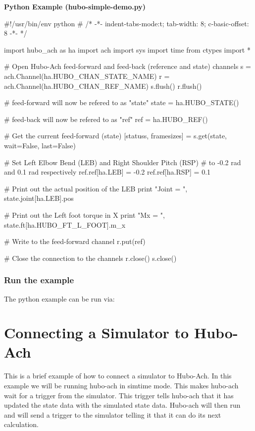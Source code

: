 \footnotesize
\noindent \textbf{Python Example (hubo-simple-demo.py)}
\vspace{-6mm}
\begin{code}
#!/usr/bin/env python
# /* -*-  indent-tabs-mode:t; tab-width: 8; c-basic-offset: 8  -*- */

import hubo_ach as ha
import ach
import sys
import time
from ctypes import *

# Open Hubo-Ach feed-forward and feed-back (reference and state) channels
s = ach.Channel(ha.HUBO_CHAN_STATE_NAME)
r = ach.Channel(ha.HUBO_CHAN_REF_NAME)
s.flush()
r.flush()

# feed-forward will now be refered to as "state"
state = ha.HUBO_STATE()

# feed-back will now be refered to as "ref"
ref = ha.HUBO_REF()

# Get the current feed-forward (state) 
[statuss, framesizes] = s.get(state, wait=False, last=False)

# Set Left Elbow Bend (LEB) and Right Shoulder Pitch (RSP) 
# to  -0.2 rad and 0.1 rad respectively
ref.ref[ha.LEB] = -0.2
ref.ref[ha.RSP] = 0.1

# Print out the actual position of the LEB
print "Joint = ", state.joint[ha.LEB].pos

# Print out the Left foot torque in X
print "Mx = ", state.ft[ha.HUBO_FT_L_FOOT].m_x

# Write to the feed-forward channel
r.put(ref)

# Close the connection to the channels
r.close()
s.close()
\end{code}
\normalsize

\subsubsection{Run the example}
The python example can be run via:





\section{Connecting a Simulator to Hubo-Ach}
This is a brief example of how to connect a simulator to Hubo-Ach. In this example we will be running hubo-ach in simtime mode. This makes hubo-ach wait for a trigger from the simulator. This trigger tells hubo-ach that it has updated the state data with the simulated state data. Hubo-ach will then run and will send a trigger to the simulator telling it that it can do its next calculation.

